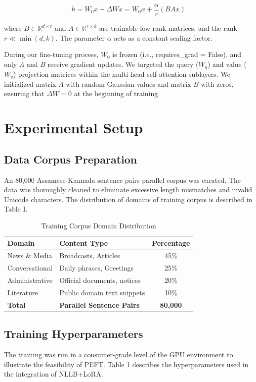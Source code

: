 \documentclass[conference]{IEEEtran}
\begin{document}
\begin{equation}
h = W_0 x + \Delta W x = W_0 x + \frac{\alpha}{r} (B A x)
\end{equation}

where $B \in \mathbb{R}^{d \times r}$ and $A \in \mathbb{R}^{r \times k}$ are trainable low-rank matrices, and the rank $r \ll \min(d, k)$. The parameter $\alpha$ acts as a constant scaling factor.

During our fine-tuning process, $W_0$ is frozen (i.e., requires\_grad = False), and only $A$ and $B$ receive gradient updates. We targeted the query ($W_q$) and value ($W_v$) projection matrices within the multi-head self-attention sublayers. We initialized matrix $A$ with random Gaussian values and matrix $B$ with zeros, ensuring that $\Delta W = 0$ at the beginning of training. 

\section{Experimental Setup}

\subsection{Data Corpus Preparation}
An 80,000 Assamese-Kannada sentence pairs parallel corpus was curated. The data was thoroughly cleaned to eliminate excessive length mismatches and invalid Unicode characters. The distribution of domains of training corpus is described in Table I.

\begin{table}[h]
\caption{Training Corpus Domain Distribution}
\label{tab:dataset}
\centering
\begin{tabular}{@{}llc@{}}
\toprule
\textbf{Domain} & \textbf{Content Type} & \textbf{Percentage} \\ 
\midrule
News \& Media & Broadcasts, Articles & 45\% \\
Conversational & Daily phrases, Greetings & 25\% \\
Administrative & Official documents, notices & 20\% \\
Literature & Public domain text snippets & 10\% \\
\midrule
\textbf{Total} & \textbf{Parallel Sentence Pairs} & \textbf{80,000} \\
\bottomrule
\end{tabular}
\end{table}

\subsection{Training Hyperparameters}
The training was run in a consumer-grade level of the GPU environment to illustrate the feasibility of PEFT. Table 1 describes the hyperparameters used in the integration of NLLB+LoRA.
\end{document}
